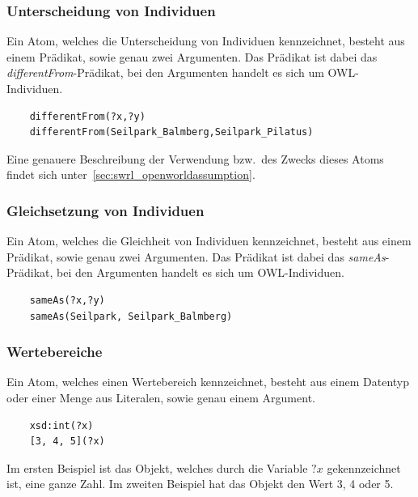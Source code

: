 \subsubsection{Unterscheidung von Individuen}
\label{ssubsec:swrl_aufbau_atomaretypen_unterscheidungvonindividuen}
Ein Atom, welches die Unterscheidung von Individuen kennzeichnet, besteht aus einem Prädikat, sowie genau zwei Argumenten. Das Prädikat ist dabei das \textit{differentFrom}-Prädikat, bei den Argumenten handelt es sich um OWL-Individuen.
\lstset{language=XML}
\begin{lstlisting}
    differentFrom(?x,?y)
    differentFrom(Seilpark_Balmberg,Seilpark_Pilatus)
\end{lstlisting}
Eine genauere Beschreibung der Verwendung bzw.\ des Zwecks dieses Atoms findet sich unter~\ref{sec:swrl_openworldassumption}.

\subsubsection{Gleichsetzung von Individuen}
\label{ssubsec:swrl_aufbau_atomaretypen_gleichsetzungvonindividuen}
Ein Atom, welches die Gleichheit von Individuen kennzeichnet, besteht aus einem Prädikat, sowie genau zwei Argumenten. Das Prädikat ist dabei das \textit{sameAs}-Prädikat, bei den Argumenten handelt es sich um OWL-Individuen.
\lstset{language=XML}
\begin{lstlisting}
    sameAs(?x,?y)
    sameAs(Seilpark, Seilpark_Balmberg)
\end{lstlisting}

\subsubsection{Wertebereiche}
\label{ssubsec:swrl_aufbau_atomaretypen_wertebereiche}
Ein Atom, welches einen Wertebereich kennzeichnet, besteht aus einem Datentyp oder einer Menge aus Literalen, sowie genau einem Argument.
\lstset{language=XML}
\begin{lstlisting}
    xsd:int(?x)
    [3, 4, 5](?x)
\end{lstlisting}
Im ersten Beispiel ist das Objekt, welches durch die Variable $?x$ gekennzeichnet ist, eine ganze Zahl. Im zweiten Beispiel hat das Objekt den Wert 3, 4 oder 5.


